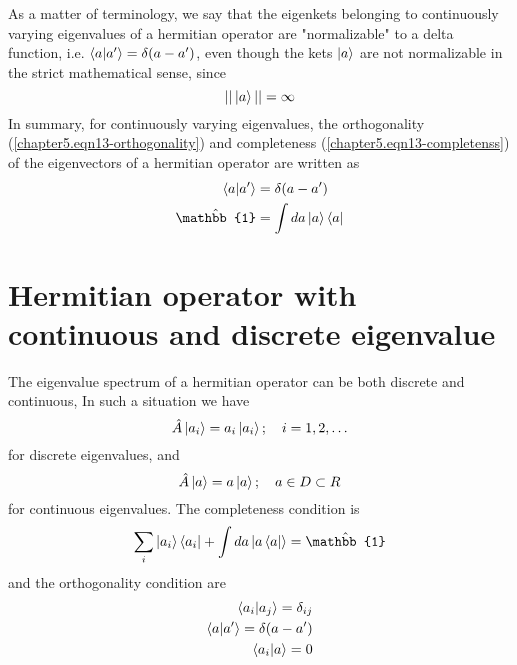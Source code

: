 		As a matter of terminology, we say that the eigenkets belonging to continuously varying eigenvalues of a hermitian operator are "normalizable" to a delta function, i.e. $\braket{a}{a^\prime} = \delta(a-a^\prime)$, even though the kets $\ket{a}$ are not normalizable in the strict mathematical sense, since
		\begin{equation}
			|| \ket{a} || = \infty
		\end{equation}
		In summary, for continuously varying eigenvalues, the orthogonality (\ref{chapter5.eqn13-orthogonality}) and completeness (\ref{chapter5.eqn13-completenss}) of the eigenvectors of a hermitian operator are written as
		\begin{eqnarray}
			\braket{a}{a^\prime} &= \delta(a-a^\prime)  \label{chapter5.eqn13-orthogonality}\\
			\hat{\mathbb{1}} &= \int da  \ket{a}\bra{a}  \label{chapter5.eqn13-completenss}
		\end{eqnarray}
		
		
	\section{Hermitian operator with continuous and discrete eigenvalue}
	The eigenvalue spectrum of a hermitian operator can be both discrete and continuous, In such a situation we have
	\begin{equation}
		\hat{A} \ket{a_i} = a_i \ket{a_i} ; \quad i=1,2,\ldots
	\end{equation}
	for discrete eigenvalues, and
	\begin{equation}
		\hat{A}\ket{a} = a\ket{a};\quad a\in D \subset R
	\end{equation}
	for continuous eigenvalues. The completeness condition is
	\begin{equation}
		\sum_i \ket{a_i}\bra{a_i} + \int da \ket{a\bra{a}} = \hat{\mathbb{1}}
	\end{equation}
	and the orthogonality condition are
	\begin{eqnarray}
		\braket{a_i}{a_j} = \delta_{ij} \\
		\braket{a}{a^\prime} =\delta(a-a^\prime)\\
		\braket{a_i}{a} = 0
	\end{eqnarray}
	
